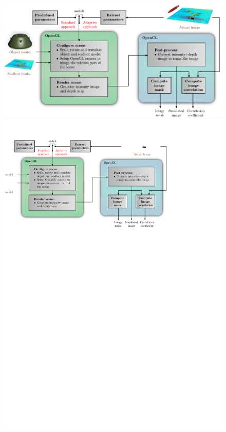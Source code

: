 \newcommand\step[1]{\tikz[baseline=(char.base)]{%
            \node[shape=circle,draw,color=Green,inner sep=0.5pt] (char) {#1};}}
\newcommand\figstep[2]{\step{#1}\mbox{}\hfill\parbox[t]{.97\linewidth}{#2}} 
\begin{figure}[t]\centering%
\ifOverLeaf%
  \includegraphics[width=\linewidth]{gfx/simulator.pdf}%
\else
  \includegraphics[drawing,width=\linewidth]{gfx/simulator.svg}%

\end{figure}
